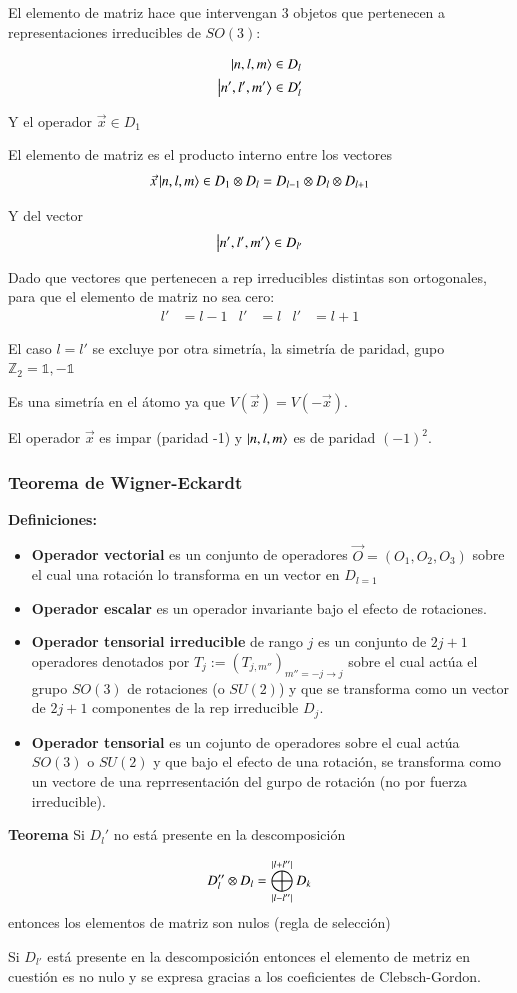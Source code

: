 El elemento de matriz hace que intervengan 3 objetos que pertenecen a representaciones irreducibles de $SO(3)$:

\begin{align*}
    \ket{n,l,m}&\in D_l\\
    \ket{n',l',m'}&\in D_l'\\
\end{align*}

Y el operador $\vec{x}\in D_1$

El elemento de matriz es el producto interno entre los vectores $$\vec{x}\ket{n,l,m}\in D_1\otimes D_l=D_{l-1}\otimes D_{l}\otimes D_{l+1}$$

Y del vector
$$ \ket{n',l',m'}\in D_{l'}$$

Dado que vectores que pertenecen a rep irreducibles distintas son ortogonales, para que el elemento de matriz no sea cero:
\begin{align*}
    l'&=l-1&l'&=l&l'&=l+1
\end{align*}

El caso $l=l'$ se excluye por otra simetría, la simetría de paridad, gupo $\mathbb{Z}_2={\mathbb{1,-1}}$

Es una simetría en el átomo ya que $V(\vec{x})=V(-\vec{x})$.

El operador $\vec{x}$ es impar (paridad -1) y $\ket{n,l,m}$ es de paridad $(-1)^2$.

\subsubsection{Teorema de Wigner-Eckardt}

\textbf{Definiciones:}

\begin{itemize}
    \item \textbf{Operador vectorial} es un conjunto de operadores $\vec{O}=(O_1,O_2,O_3)$ sobre el cual una rotación lo transforma en un vector en $D_{l=1}$
    \item \textbf{Operador escalar} es un operador invariante bajo el efecto de rotaciones.
    \item \textbf{Operador tensorial irreducible} de rango $j$ es un conjunto de $2j+1$ operadores denotados por $T_j:=(T_{j,m''})_{m''=-j\rightarrow j}$ sobre el cual actúa el grupo $SO(3)$ de rotaciones (o $SU(2)$) y que se transforma como un vector de $2j+1$ componentes de la rep irreducible $D_j$.
    \item \textbf{Operador tensorial} es un cojunto de operadores sobre el cual actúa $SO(3)$ o $SU(2)$ y que bajo el efecto de una rotación, se transforma como un vectore de una reprresentación del gurpo de rotación (no por fuerza irreducible).
\end{itemize}

\textbf{Teorema} Si $D_l'$ no está presente en la descomposición 

$$
D_l''\otimes D_l = \bigoplus_{\abs*{l-l''}}^{\abs{l+l''}}D_k
$$
 entonces los elementos de matriz son nulos (regla de selección)

 Si $D_{l'}$ está presente en la descomposición entonces el elemento de metriz en cuestión es no nulo y se expresa gracias a los coeficientes de Clebsch-Gordon.